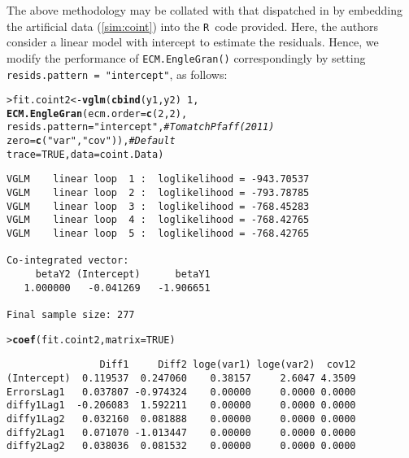 \documentclass[a4paper, 11pt]{article}\usepackage[]{graphicx}\usepackage[]{color}
\makeatletter
\newcommand{\hlnum}[1]{\textcolor[rgb]{0.686,0.059,0.569}{#1}}%
\newcommand{\hlstr}[1]{\textcolor[rgb]{0.192,0.494,0.8}{#1}}%
\newcommand{\hlcom}[1]{\textcolor[rgb]{0.678,0.584,0.686}{\textit{#1}}}%
\newcommand{\hlopt}[1]{\textcolor[rgb]{0,0,0}{#1}}%
\newcommand{\hlstd}[1]{\textcolor[rgb]{0.345,0.345,0.345}{#1}}%
\newcommand{\hlkwb}[1]{\textcolor[rgb]{0.69,0.353,0.396}{#1}}%
\newcommand{\hlkwc}[1]{\textcolor[rgb]{0.333,0.667,0.333}{#1}}%
\newcommand{\hlkwd}[1]{\textcolor[rgb]{0.737,0.353,0.396}{\textbf{#1}}}%
\newenvironment{kframe}{%
 \def\at@end@of@kframe{}%
 \ifinner\ifhmode%
  \def\at@end@of@kframe{\end{minipage}}%
  \begin{minipage}{\columnwidth}%
 \fi\fi%
 \def\FrameCommand##1{\hskip\@totalleftmargin \hskip-\fboxsep
 \colorbox{shadecolor}{##1}\hskip-\fboxsep
     \hskip-\linewidth \hskip-\@totalleftmargin \hskip\columnwidth}%
 \MakeFramed {\advance\hsize-\width
   \@totalleftmargin\z@ \linewidth\hsize
   \@setminipage}}%
 {\par\unskip\endMakeFramed%
 \at@end@of@kframe}
\newenvironment{knitrout}{}{} %
\newcommand{\Rcol}{{\color{blue} {\large \texttt{R}}}~}
\makeatother
\begin{document}
\vspace{2mm}
The above methodology may be collated with that dispatched in
\cite{pfaf:2011} by 
embedding the artificial data (\ref{sim:coint}) into
the \Rcol code provided. 
Here, the authors consider a linear model with intercept
to estimate the residuals.
Hence, we modify the performance of 
{\color{blue} \texttt{ECM.EngleGran()}} correspondingly
by setting {\color{blue} \texttt{resids.pattern = "intercept"}},
as follows:

\begin{knitrout}\scriptsize
{}\color{fgcolor}\begin{kframe}
\begin{alltt}
\hlstd{> }\hlstd{fit.coint2} \hlkwb{<-} \hlkwd{vglm}\hlstd{(}\hlkwd{cbind}\hlstd{(y1, y2)} \hlopt{~} \hlnum{1}\hlstd{,}
\hlstd{  }                   \hlkwd{ECM.EngleGran}\hlstd{(}\hlkwc{ecm.order} \hlstd{=} \hlkwd{c}\hlstd{(}\hlnum{2}\hlstd{,} \hlnum{2}\hlstd{),}
\hlstd{  }                                 \hlkwc{resids.pattern} \hlstd{=} \hlstr{"intercept"}\hlstd{,} \hlcom{# To match Pfaff (2011)}
\hlstd{  }                                 \hlkwc{zero} \hlstd{=} \hlkwd{c}\hlstd{(}\hlstr{"var"}\hlstd{,} \hlstr{"cov"}\hlstd{)),} \hlcom{# Default}
\hlstd{  }                   \hlkwc{trace} \hlstd{=} \hlnum{TRUE}\hlstd{,} \hlkwc{data} \hlstd{= coint.Data)}
\end{alltt}
\begin{verbatim}
VGLM    linear loop  1 :  loglikelihood = -943.70537
VGLM    linear loop  2 :  loglikelihood = -793.78785
VGLM    linear loop  3 :  loglikelihood = -768.45283
VGLM    linear loop  4 :  loglikelihood = -768.42765
VGLM    linear loop  5 :  loglikelihood = -768.42765

Co-integrated vector:
     betaY2 (Intercept)      betaY1 
   1.000000   -0.041269   -1.906651 
                      
Final sample size: 277
\end{verbatim}
\begin{alltt}
\hlstd{> }\hlkwd{coef}\hlstd{(fit.coint2,} \hlkwc{matrix} \hlstd{=} \hlnum{TRUE}\hlstd{)}
\end{alltt}
\begin{verbatim}
                Diff1     Diff2 loge(var1) loge(var2)  cov12
(Intercept)  0.119537  0.247060    0.38157     2.6047 4.3509
ErrorsLag1   0.037807 -0.974324    0.00000     0.0000 0.0000
diffy1Lag1  -0.206083  1.592211    0.00000     0.0000 0.0000
diffy1Lag2   0.032160  0.081888    0.00000     0.0000 0.0000
diffy2Lag1   0.071070 -1.013447    0.00000     0.0000 0.0000
diffy2Lag2   0.038036  0.081532    0.00000     0.0000 0.0000
\end{verbatim}
\end{kframe}
\end{knitrout}
\end{document}
